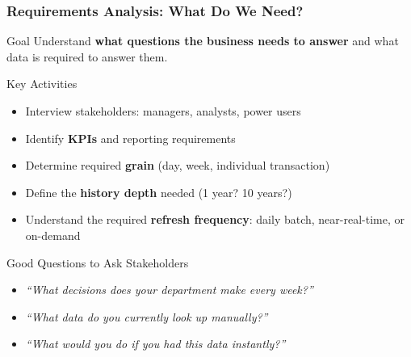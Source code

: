 \begin{frame}
  \frametitle{Requirements Analysis: What Do We Need?}

  \begin{block}{Goal}
    Understand \textbf{what questions the business needs to answer}
    and what data is required to answer them.
  \end{block}

  \begin{block}{Key Activities}
    \begin{itemize}
      \item Interview stakeholders: managers, analysts, power users
      \item Identify \textbf{KPIs} and reporting requirements
      \item Determine required \textbf{grain} (day, week, individual transaction)
      \item Define the \textbf{history depth} needed (1 year? 10 years?)
      \item Understand the required \textbf{refresh frequency}:
        daily batch, near-real-time, or on-demand
    \end{itemize}
  \end{block}

  \begin{examples}{Good Questions to Ask Stakeholders}
    \begin{itemize}
      \item \textit{``What decisions does your department make every week?''}
      \item \textit{``What data do you currently look up manually?''}
      \item \textit{``What would you do if you had this data instantly?''}
    \end{itemize}
  \end{examples}
\end{frame}


